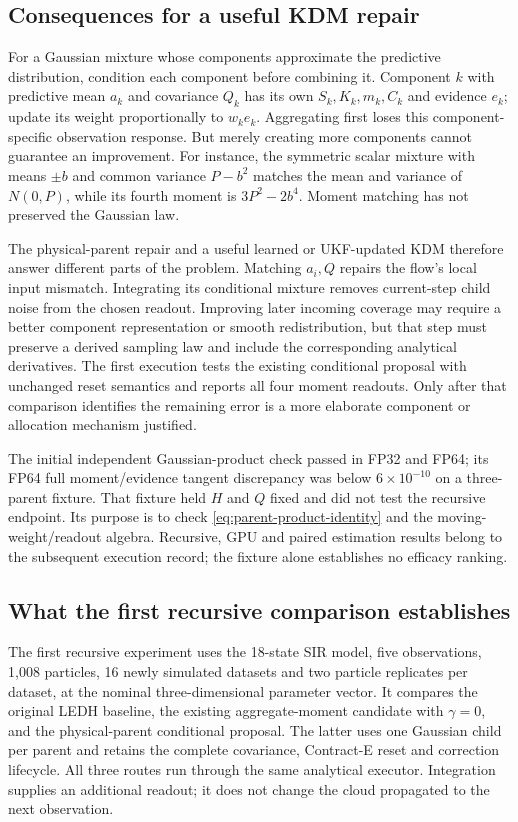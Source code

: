 \subsection{Consequences for a useful KDM repair}

For a Gaussian mixture whose components approximate the predictive
distribution, condition each component before combining it. Component $k$
with predictive mean $a_k$ and covariance $Q_k$ has its own $S_k,K_k,m_k,C_k$
and evidence $e_k$; update its weight proportionally to $w_ke_k$. Aggregating
first loses this component-specific observation response. But merely creating
more components cannot guarantee an improvement. For instance, the symmetric
scalar mixture with means $\pm b$ and common variance $P-b^2$ matches the
mean and variance of $N(0,P)$, while its fourth moment is $3P^2-2b^4$.
Moment matching has not preserved the Gaussian law.

The physical-parent repair and a useful learned or UKF-updated KDM therefore
answer different parts of the problem. Matching $a_i,Q$ repairs the flow's
local input mismatch. Integrating its conditional mixture removes current-step
child noise from the chosen readout. Improving later incoming coverage may
require a better component representation or smooth redistribution, but that
step must preserve a derived sampling law and include the corresponding
analytical derivatives. The first execution tests the existing conditional
proposal with unchanged reset semantics and reports all four moment readouts.
Only after that comparison identifies the remaining error is a more elaborate
component or allocation mechanism justified.

The initial independent Gaussian-product check passed in FP32 and FP64; its
FP64 full moment/evidence tangent discrepancy was below $6\times10^{-10}$
on a three-parent fixture. That fixture held $H$ and $Q$ fixed and did not test
the recursive endpoint. Its purpose is to check
\eqref{eq:parent-product-identity} and the moving-weight/readout algebra.
Recursive, GPU and paired estimation results belong to the subsequent
execution record; the fixture alone establishes no efficacy ranking.

\subsection{What the first recursive comparison establishes}

The first recursive experiment uses the 18-state SIR model, five observations,
1,008 particles, 16 newly simulated datasets and two particle replicates per
dataset, at the nominal three-dimensional parameter vector. It compares the
original LEDH baseline, the existing aggregate-moment candidate with
$\gamma=0$, and the physical-parent conditional proposal. The latter uses one
Gaussian child per parent and retains the complete covariance, Contract-E
reset and correction lifecycle. All three routes run through the same
analytical executor. Integration supplies an additional readout; it does not
change the cloud propagated to the next observation.

